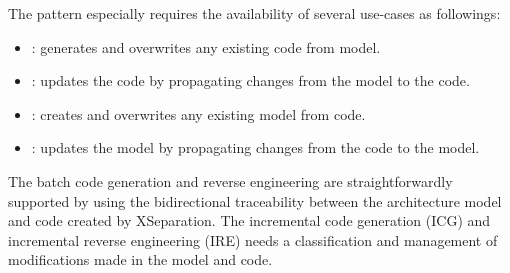 The pattern especially requires the availability of several use-cases as followings:

\begin{itemize}[\footnotesize]
	\itemsep0em
	\item {}: generates and overwrites any existing code from model.
	\item {}: updates the code by propagating changes from the model to the code.
	\item {}: creates and overwrites any existing model from code.
	\item {}: updates the model by propagating changes from the code to the model.
\end{itemize}


The batch code generation and reverse engineering are straightforwardly supported by using the bidirectional traceability between the architecture model and code created by XSeparation. The incremental code generation (ICG) and incremental reverse engineering (IRE) needs a classification and management of modifications made in the model and code.

